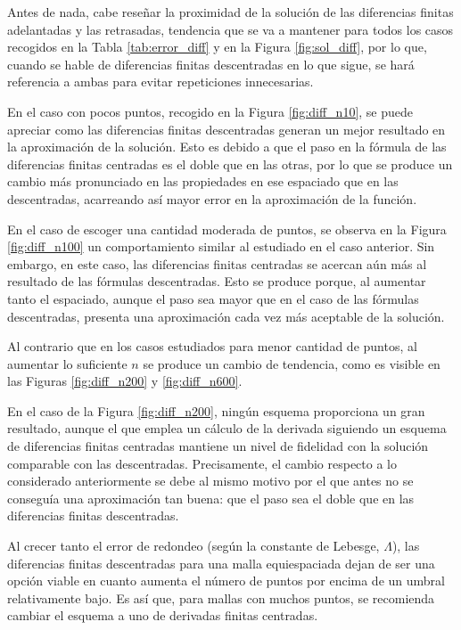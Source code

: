 Antes de nada, cabe reseñar la proximidad de la solución de las diferencias finitas adelantadas y las retrasadas, tendencia que se va a mantener para todos los casos recogidos en la Tabla \ref{tab:error_diff} y en la Figura \ref{fig:sol_diff}, por lo que, cuando se hable de diferencias finitas descentradas en lo que sigue, se hará referencia a ambas para evitar repeticiones innecesarias.

En el caso con pocos puntos, recogido en la Figura \ref{fig:diff_n10}, se puede apreciar como las diferencias finitas descentradas generan un mejor resultado en la aproximación de la solución. Esto es debido a que el paso en la fórmula de las diferencias finitas centradas es el doble que en las otras, por lo que se produce un cambio más pronunciado en las propiedades en ese espaciado que en las descentradas, acarreando así mayor error en la aproximación de la función. 

En el caso de escoger una cantidad moderada de puntos, se observa en la Figura \ref{fig:diff_n100} un comportamiento similar al estudiado en el caso anterior. Sin embargo, en este caso, las diferencias finitas centradas se acercan aún más al resultado de las fórmulas descentradas. Esto se produce porque, al aumentar tanto el espaciado, aunque el paso sea mayor que en el caso de las fórmulas descentradas, presenta una aproximación cada vez más aceptable de la solución.   

Al contrario que en los casos estudiados para menor cantidad de puntos, al aumentar lo suficiente $n$ se produce un cambio de tendencia, como es visible en las Figuras \ref{fig:diff_n200} y \ref{fig:diff_n600}. 

En el caso de la Figura \ref{fig:diff_n200}, ningún esquema proporciona un gran resultado, aunque el que emplea un cálculo de la derivada siguiendo un esquema de diferencias finitas centradas mantiene un nivel de fidelidad con la solución comparable con las descentradas. Precisamente, el cambio respecto a lo considerado anteriormente se debe al mismo motivo por el que antes no se conseguía una aproximación tan buena: que el paso sea el doble que en las diferencias finitas descentradas. 

Al crecer tanto el error de redondeo (según la constante de Lebesge, $\Lambda$), las diferencias finitas descentradas para una malla equiespaciada dejan de ser una opción viable en cuanto aumenta el número de puntos por encima de un umbral relativamente bajo. Es así que, para mallas con muchos puntos, se recomienda cambiar el esquema a uno de derivadas finitas centradas.

